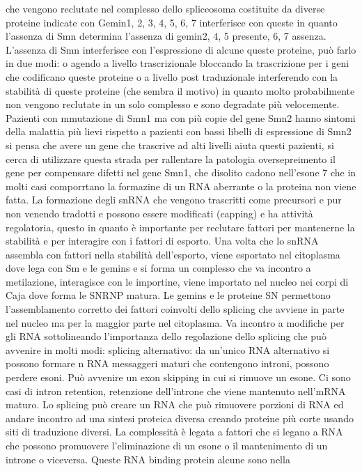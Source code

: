 che vengono reclutate nel complesso dello spliceosoma costituite da diverse proteine indicate con Gemin1, 2, 3, 4, 5, 6, 7 interferisce con queste in quanto l'assenza di Smn determina
l'assenza di gemin2, 4, 5 presente, 6, 7 assenza. L'assenza di Smn interferisce con  l'espressione di alcune queste proteine, pu\`o farlo in due modi: o agendo a livello trascrizionale 
bloccando la trascrizione per i geni che codificano queste proteine o a livello post traduzionale interferendo con la stabilit\`a di queste proteine (che sembra il motivo) in quanto 
molto probabilmente non vengono reclutate in un solo complesso e sono degradate pi\`u velocemente. Pazienti con mmutazione di Smn1 ma con pi\`u copie del gene Smn2 hanno sintomi della
malattia pi\`u lievi rispetto a pazienti con bassi libelli di espressione di Smn2 si pensa che avere un gene che trascrive ad alti livelli aiuta questi pazienti, si cerca di utilizzare
questa strada per rallentare la patologia oversepreimento il gene per compensare difetti nel gene Smn1, che disolito cadono nell'esone 7 che in molti casi comporrtano la formazine di un
RNA aberrante o la proteina non viene fatta. 
La formazione degli snRNA che vengono trascritti come precursori e pur non venendo 
tradotti e possono essere modificati (capping) e ha attivit\`a regolatoria, questo in quanto \`e importante per reclutare fattori per mantenerne la stabilit\`a e per interagire con i 
fattori di esporto. Una volta che lo snRNA assembla con fattori nella stabilit\`a dell'esporto, viene esportato nel citoplasma dove lega con Sm e le gemins e si forma un complesso che
va incontro a metilazione, interagisce con le importine, viene importato nel nucleo nei corpi di Caja dove forma le SNRNP matura. Le gemins e le proteine SN permettono l'assemblamento 
corretto dei fattori coinvolti dello splicing che avviene in parte nel nucleo ma per la maggior parte nel citoplasma. Va incontro a modifiche per gli RNA sottolineando l'importanza dello
regolazione dello splicing che pu\`o avvenire in molti modi: splicing alternativo: da un'unico RNA alternativo si possono formare n RNA messaggeri maturi che contengono introni, possono
perdere esoni. Pu\`o avvenire un exon skipping in cui si rimuove un esone. Ci sono casi di intron retention, retenzione dell'introne che viene mantenuto nell'mRNA maturo. Lo splicing 
pu\`o creare un RNA che pu\`o rimuovere porzioni di RNA ed andare incontro ad una sintesi proteica diversa creando proteine pi\`u corte usando siti di traduzione diversi. La complessit\`a
\`e legata a fattori che si legano a RNA che possono promuovere l'eliminazione di un esone o il mantenimento di un introne o viceversa. Queste RNA binding protein alcune sono nella
